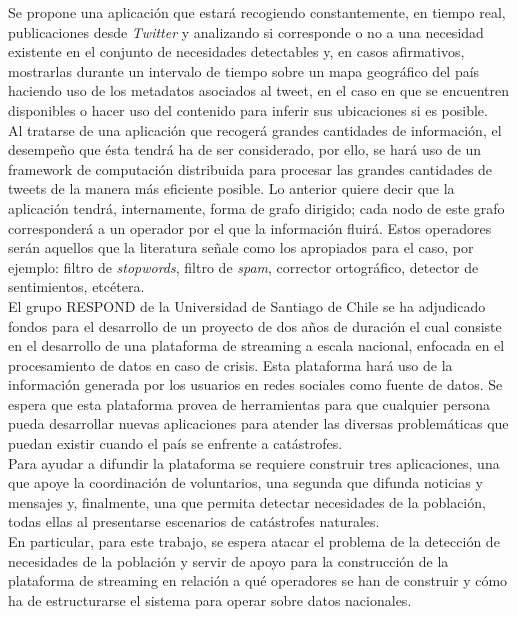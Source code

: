 Se propone una aplicación que estará recogiendo constantemente, en tiempo real, publicaciones desde \textit{Twitter} y analizando si corresponde o no a una necesidad existente en el conjunto de necesidades detectables y, en casos afirmativos, mostrarlas durante un intervalo de tiempo sobre un mapa geográfico del país haciendo uso de los metadatos asociados al tweet, en el caso en que se encuentren disponibles o hacer uso del contenido para inferir sus ubicaciones si es posible.\\

Al tratarse de una aplicación que recogerá grandes cantidades de información, el desempeño que ésta tendrá ha de ser considerado, por ello, se hará uso de un framework de computación distribuida para procesar las grandes cantidades de tweets de la manera más eficiente posible. Lo anterior quiere decir que la aplicación tendrá, internamente, forma de grafo dirigido; cada nodo de este grafo corresponderá a un operador por el que la información fluirá. Estos operadores serán aquellos que la literatura señale como los apropiados para el caso, por ejemplo: filtro de \textit{stopwords}, filtro de \textit{spam}, corrector ortográfico, detector de sentimientos, etcétera.\\

El grupo RESPOND de la Universidad de Santiago de Chile se ha adjudicado fondos para el desarrollo de un proyecto de dos años de duración el cual consiste en el desarrollo de una plataforma de streaming a escala nacional, enfocada en el procesamiento de datos en caso de crisis. Esta plataforma hará uso de la información generada por los usuarios en redes sociales como fuente de datos. Se espera que esta plataforma provea de herramientas para que cualquier persona pueda desarrollar nuevas aplicaciones para atender las diversas problemáticas que puedan existir cuando el país se enfrente a catástrofes.\\

Para ayudar a difundir la plataforma se requiere construir tres aplicaciones, una que apoye la coordinación de voluntarios, una segunda que difunda noticias y mensajes y, finalmente, una que permita detectar necesidades de la población, todas ellas al presentarse escenarios de catástrofes naturales.\\

En particular, para este trabajo, se espera atacar el problema de la detección de necesidades de la población y servir de apoyo para la construcción de la plataforma de streaming en relación a qué operadores se han de construir y cómo ha de estructurarse el sistema para operar sobre datos nacionales.



